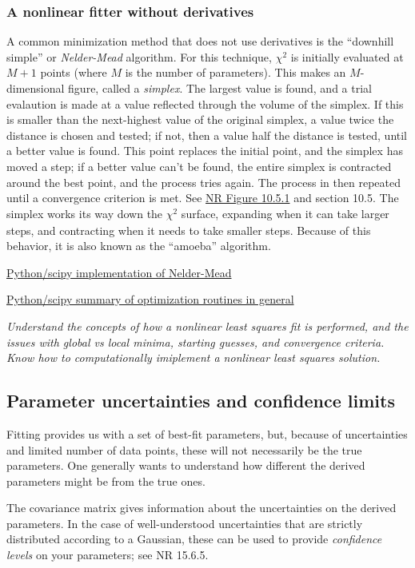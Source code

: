 \documentclass{article}
\newcommand{\test}[1]{%
    \begin{center}
        \colorbox{hl}{\parbox{0.9\textwidth}{\emph{#1}}}
    \end{center}}
\begin{document}
\subsubsection{A nonlinear fitter without derivatives}
A common minimization method that does not use derivatives is the
``downhill simple'' or \emph{Nelder-Mead} algorithm.
For this technique, $\chi^{2}$ is initially evaluated at $M+1$ points
(where $M$ is the number of parameters).
This makes an $M$-dimensional figure, called a \emph{simplex}.
The largest value is found, and a trial evalaution is made at
a value reflected through the volume of the simplex. If this is
smaller than the next-highest value of the original simplex, a value
twice the distance is chosen and tested; if not, then a value half the
distance is tested, until a better value is found. This point replaces
the initial point, and the simplex has moved a step; if a better value
can't be found, the entire simplex is contracted around the best
point, and the process tries again. The process in then repeated until
a convergence criterion is met. See
\href{}
{NR Figure 10.5.1} and section 10.5.
The simplex works its way down the $ \chi^{2}_{}$ surface, expanding
when it can take larger steps, and contracting when it needs to take
smaller steps. Because of this behavior, it is also known as the
``amoeba'' algorithm.

\href{http://docs.scipy.org/doc/scipy-0.16.0/reference/generated/scipy.optimize.fmin.html}
{Python/scipy implementation of Nelder-Mead}

\href{https://docs.scipy.org/doc/scipy-0.16.1/reference/tutorial/optimize.html}
{Python/scipy summary of optimization routines in general}

\test{Understand the concepts of how a nonlinear least squares fit is
performed, and the issues with global vs local minima,
starting guesses, and convergence criteria. Know how to
computationally imiplement a nonlinear least squares solution.}

\subsection{Parameter uncertainties and confidence limits} Fitting provides us
with a set of best-fit parameters, but, because of uncertainties and limited
number of data points, these will not necessarily be the true parameters. One
generally wants to understand how different the derived parameters might be
from the true ones.

The covariance matrix gives information about the uncertainties on the derived
parameters. In the case of well-understood uncertainties that are strictly
distributed according to a Gaussian, these can be used to provide
\emph{confidence levels} on your parameters; see NR 15.6.5.
\end{document}
